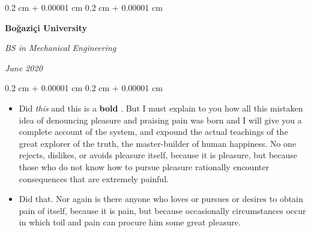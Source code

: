 \documentclass[10pt, letterpaper]{article}
\newenvironment{highlights}{
    \begin{itemize}[
        topsep=0.10 cm,
        parsep=0.10 cm,
        partopsep=0pt,
        itemsep=0pt,
        leftmargin=0.4 cm + 10pt
    ]
}{
    \end{itemize}
} %
\newenvironment{onecolentry}{
    \begin{adjustwidth}{
        0.2 cm + 0.00001 cm
    }{
        0.2 cm + 0.00001 cm
    }
}{
    \end{adjustwidth}
} %
\newenvironment{twocolentry}[2][]{
    \onecolentry
    \def\secondColumn{#2}
    \setcolumnwidth{\fill, 4.5 cm}
    \begin{paracol}{2}
}{
    \switchcolumn \raggedleft \secondColumn
    \end{paracol}
    \endonecolentry
} %
\let\hrefWithoutArrow\href
\renewcommand{\href}[2]{\hrefWithoutArrow{#1}{\ifthenelse{\equal{#2}{}}{ }{#2 }\raisebox{.15ex}{\footnotesize \faExternalLink*}}}
\begin{document}
        \begin{twocolentry}{
            
            
        \textit{June 2020}}
            \textbf{Boğaziçi University}

            \textit{BS in Mechanical Engineering}
        \end{twocolentry}
        \vspace{0.10 cm}
        \begin{onecolentry}
            \begin{highlights}
                \item Did \textit{this} and this is a \textbf{bold} \href{https://example.com}{link}. But I must explain to you how all this mistaken idea of denouncing pleasure and praising pain was born and I will give you a complete account of the system, and expound the actual teachings of the great explorer of the truth, the master-builder of human happiness. No one rejects, dislikes, or avoids pleasure itself, because it is pleasure, but because those who do not know how to pursue pleasure rationally encounter consequences that are extremely painful.
                \item Did that. Nor again is there anyone who loves or pursues or desires to obtain pain of itself, because it is pain, but because occasionally circumstances occur in which toil and pain can procure him some great pleasure.
            \end{highlights}
        \end{onecolentry}


        \vspace{0.2 cm}
\end{document}
